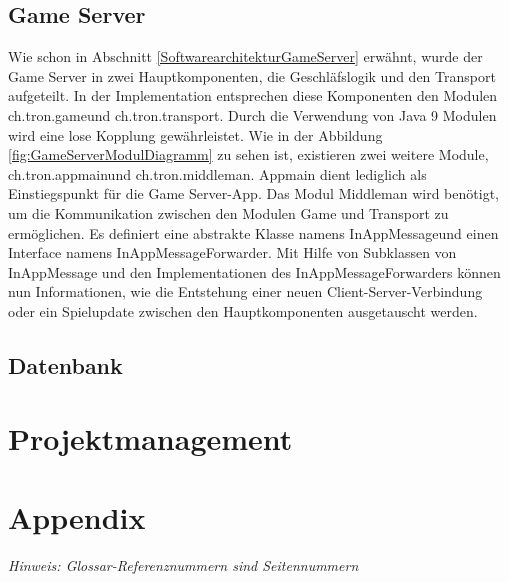 \documentclass[11pt,ngerman]{article}
\begin{document}
    \subsection{\Gls{Game Server}}
    Wie schon in Abschnitt \ref{SoftwarearchitekturGameServer} erwähnt, wurde der \Gls{Game Server} in zwei Hauptkomponenten, die Geschläfslogik und den Transport aufgeteilt. In der Implementation entsprechen diese Komponenten den Modulen \dq ch.tron.game\dq und \dq ch.tron.transport\dq. Durch die Verwendung von Java 9 Modulen wird eine lose Kopplung gewährleistet. Wie in der Abbildung \ref{fig:GameServerModulDiagramm} zu sehen ist, existieren zwei weitere Module, \dq ch.tron.appmain\dq und \dq ch.tron.middleman\dq. Appmain dient lediglich als Einstiegspunkt für die \Gls{Game Server}-App. Das Modul Middleman wird benötigt, um die Kommunikation zwischen den Modulen Game und Transport zu ermöglichen. Es definiert eine abstrakte Klasse namens \dq InAppMessage\dq und einen Interface namens \dq InAppMessageForwarder\dq. Mit Hilfe von Subklassen von InAppMessage und den Implementationen des InAppMessageForwarders können nun Informationen, wie die Entstehung einer neuen Client-Server-Verbindung oder ein Spielupdate zwischen den Hauptkomponenten ausgetauscht werden.

    \subsection{Datenbank}

    \section{Projektmanagement}


     \newpage

    \section{Appendix}
    \textit{Hinweis: Glossar-Referenznummern sind Seitennummern}
    \printglossary
\end{document}
